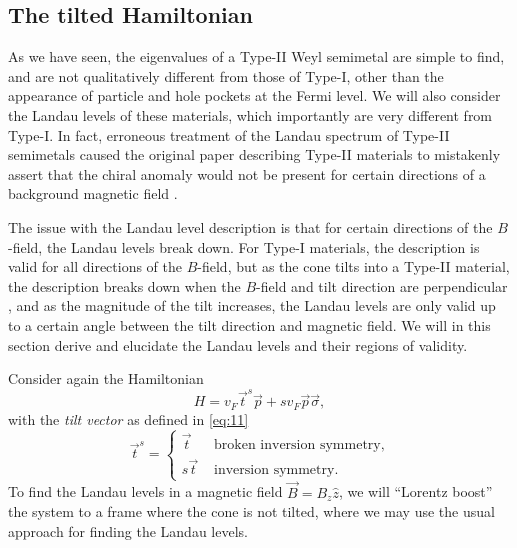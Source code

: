 \subsection{The tilted Hamiltonian}\label{sec:ll-tilt}
As we have seen, the eigenvalues of a Type-II Weyl semimetal are simple to find, and are not qualitatively different from those of Type-I, other than the appearance of particle and hole pockets at the Fermi level.
We will also consider the Landau levels of these materials, which importantly are very different from Type-I.
In fact, erroneous treatment of the Landau spectrum of Type-II semimetals caused the original paper describing Type-II materials to mistakenly assert that the chiral anomaly would not be present for certain directions of a background magnetic field \cites{soluyanovTypeIIWeylSemimetals2015,sharmaChiralAnomalyLongitudinal2017}.

The issue with the Landau level description is that for certain directions of the \(B\)-field, the Landau levels break down.
For Type-I materials, the description is valid for all directions of the \(B\)-field, but as the cone tilts into a Type-II material, the description breaks down when the \(B\)-field and tilt direction are perpendicular \cite{sharmaChiralAnomalyLongitudinal2017}, and as the magnitude of the tilt increases, the Landau levels are only valid up to a certain angle between the tilt direction and magnetic field.
We will in this section derive and elucidate the Landau levels and their regions of validity.

Consider again the Hamiltonian
\begin{equation}
  \label{eq:29}
  H = v_{F} \vec{t}^s  \vec{p} + s v_{F} \vec{p} \vec{\sigma},
\end{equation}
with the \emph{tilt vector} as defined in \cref{eq:11}
\[
  \vec{t}^s
  =
  \begin{cases}
    \vec{t} & \text{ broken inversion symmetry},\\
    s \vec{t} & \text{ inversion symmetry}.
  \end{cases}
\]
To find the Landau levels in a magnetic field \(\vec{B} = B_{z}\hat{z} \), we will ``Lorentz boost'' the system to a frame where the cone is not tilted, where we may use the usual approach for finding the Landau levels.

